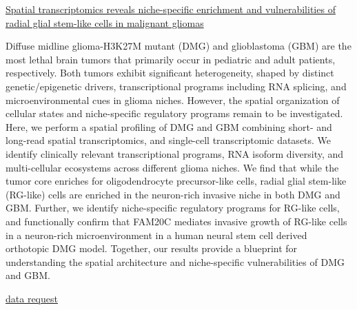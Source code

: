 \documentclass[
]{book}
\begin{document}
\href{https://www.nature.com/articles/s41467-023-36707-6}{Spatial transcriptomics reveals niche-specific enrichment and vulnerabilities of radial glial stem-like cells in malignant gliomas}

Diffuse midline glioma-H3K27M mutant (DMG) and glioblastoma (GBM) are the most lethal brain tumors that primarily occur in pediatric and adult patients, respectively. Both tumors exhibit significant heterogeneity, shaped by distinct genetic/epigenetic drivers, transcriptional programs including RNA splicing, and microenvironmental cues in glioma niches. However, the spatial organization of cellular states and niche-specific regulatory programs remain to be investigated. Here, we perform a spatial profiling of DMG and GBM combining short- and long-read spatial transcriptomics, and single-cell transcriptomic datasets. We identify clinically relevant transcriptional programs, RNA isoform diversity, and multi-cellular ecosystems across different glioma niches. We find that while the tumor core enriches for oligodendrocyte precursor-like cells, radial glial stem-like (RG-like) cells are enriched in the neuron-rich invasive niche in both DMG and GBM. Further, we identify niche-specific regulatory programs for RG-like cells, and functionally confirm that FAM20C mediates invasive growth of RG-like cells in a neuron-rich microenvironment in a human neural stem cell derived orthotopic DMG model. Together, our results provide a blueprint for understanding the spatial architecture and niche-specific vulnerabilities of DMG and GBM\citep{ren2023spatial}.

\href{https://ngdc.cncb.ac.cn/gsa-human/browse/HRA001865}{data request}
\end{document}
